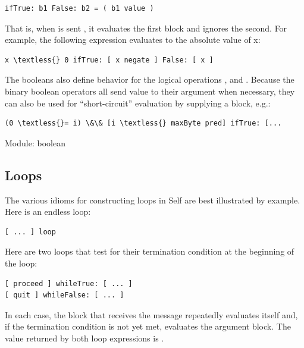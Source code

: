 \documentclass[letterpaper,10pt,english]{sphinxmanual}
\begin{document}
\begin{Verbatim}[commandchars=\\\{\}]
ifTrue: b1 False: b2 = ( b1 value )
\end{Verbatim}

That is, when  is sent , it evaluates the first block and ignores the second.
For example, the following expression evaluates to the absolute value of x:

\begin{Verbatim}[commandchars=\\\{\}]
x \textless{} 0 ifTrue: [ x negate ] False: [ x ]
\end{Verbatim}

The booleans also define behavior for the logical operations , and . Because the binary boolean operators all send value to their argument when
necessary, they can also be used for “short-circuit” evaluation by supplying a block, e.g.:

\begin{Verbatim}[commandchars=\\\{\}]
(0 \textless{}= i) \&\& [i \textless{} maxByte pred] ifTrue: [...
\end{Verbatim}

Module: boolean


\subsection{Loops}
\label{blocks:loops}
The various idioms for constructing loops in Self are best illustrated by example.
Here is an endless loop:

\begin{Verbatim}[commandchars=\\\{\}]
[ ... ] loop
\end{Verbatim}

Here are two loops that test for their termination condition at the beginning of the loop:

\begin{Verbatim}[commandchars=\\\{\}]
[ proceed ] whileTrue: [ ... ]
[ quit ] whileFalse: [ ... ]
\end{Verbatim}

In each case, the block that receives the message repeatedly evaluates itself and, if the termination
condition is not yet met, evaluates the argument block. The value returned by both loop expressions
is .
\end{document}
